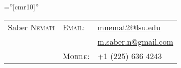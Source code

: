 \documentclass[a4paper,9pt]{article}
\begin{document}

\pagestyle{empty} %

\font\fb=''[cmr10]'' %


\begin{tabular}{lll}
{\centering
		{\huge Saber \textsc{Nemati}
	}} \hspace{4cm} & \textsc{Email}: & \href{mailto:mnemat2@lsu.edu}{mnemat2@lsu.edu}\\
	& & \href{mailto:m.saber.n@gmail.com}{m.saber.n@gmail.com}\\
	& \textsc{Mobile}: & +1 (225) 636 4243\\

\end{tabular}




\end{document}
